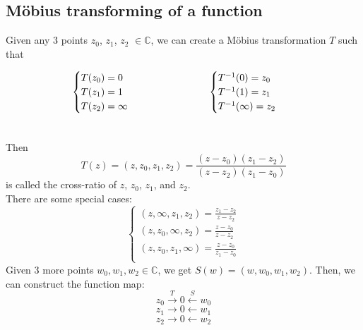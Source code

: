 \documentclass[11pt]{article}
\begin{document}
\subsection{Möbius transforming of a function}
Given any 3 points $z_0$, $z_1$, $z_2$ $\in \mathbb{C}$, we can create a Möbius transformation $T$ such that  

\begin{alignat*}{2}
    & \begin{aligned} & \begin{cases}
  T(z_0) = 0\\
  T(z_1) = 1\\
  T(z_2) = \infty \\
  \end{cases}\\
  \MoveEqLeft[-1]\text{}
  \end{aligned}
    & \hskip 6em &
  \begin{aligned}
  & \begin{cases}
  T^{-1}(0) = z_0\\
  T^{-1}(1) = z_1\\
  T^{-1}(\infty) = z_2\\
  \end{cases} \\[0ex]
  \MoveEqLeft[-1]\text{}
  \end{aligned}
\end{alignat*}

Then 
$$T(z) = (z, z_0, z_1, z_2) = \frac{(z -z_0)(z_1 - z_2)}{(z - z_2)(z_1 - z_0)}$$
is called the cross-ratio of $z$, $z_0$, $z_1$, and $z_2$. \\
There are some special cases: 
\[ \begin{cases} 
	(z, \infty, z_1, z_2) = \frac{z_1 - z_2}{z - z_2} \\
	(z, z_0, \infty, z_2) = \frac{z - z_0}{z - z_2} \\
	(z, z_0, z_1, \infty) = \frac{z - z_0}{z_1 - z_0}\\
   \end{cases}
\]
Given 3 more points $w_0, w_1, w_2 \in \mathbb{C}$, we get $S(w) = (w, w_0, w_1, w_2)$. Then, we can construct the function map: 
$$ z_0 \overset{T}{\longrightarrow} 0 \overset{S}{\longleftarrow} w_0 $$
$$ z_1 \longrightarrow 0 \longleftarrow w_1$$
$$ z_2 \longrightarrow 0 \longleftarrow w_2$$
\end{document}
